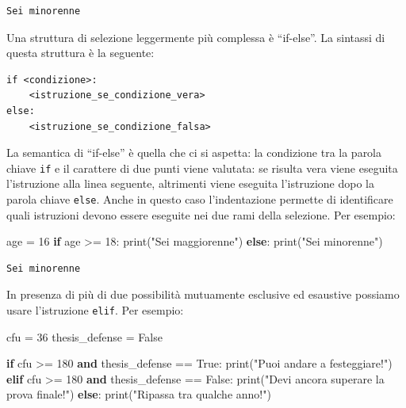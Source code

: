 \documentclass[
  letterpaper,
  krantz2]{{[}./krantz{]}}
\newenvironment{Shaded}{\begin{snugshade}}{\end{snugshade}}
\newcommand{\BuiltInTok}[1]{\textcolor[rgb]{0.00,0.23,0.31}{#1}}
\newcommand{\ControlFlowTok}[1]{\textcolor[rgb]{0.00,0.23,0.31}{\textbf{#1}}}
\newcommand{\DecValTok}[1]{\textcolor[rgb]{0.68,0.00,0.00}{#1}}
\newcommand{\KeywordTok}[1]{\textcolor[rgb]{0.00,0.23,0.31}{\textbf{#1}}}
\newcommand{\NormalTok}[1]{\textcolor[rgb]{0.00,0.23,0.31}{#1}}
\newcommand{\OperatorTok}[1]{\textcolor[rgb]{0.37,0.37,0.37}{#1}}
\newcommand{\StringTok}[1]{\textcolor[rgb]{0.13,0.47,0.30}{#1}}
\newcommand{\VariableTok}[1]{\textcolor[rgb]{0.07,0.07,0.07}{#1}}
\begin{document}
\begin{verbatim}
Sei minorenne
\end{verbatim}

Una struttura di selezione leggermente più complessa è ``if-else''. La
sintassi di questa struttura è la seguente:

\begin{verbatim}
if <condizione>:
    <istruzione_se_condizione_vera>
else:
    <istruzione_se_condizione_falsa>
\end{verbatim}

La semantica di ``if-else'' è quella che ci si aspetta: la condizione
tra la parola chiave \texttt{if} e il carattere di due punti viene
valutata: se risulta vera viene eseguita l'istruzione alla linea
seguente, altrimenti viene eseguita l'istruzione dopo la parola chiave
\texttt{else}. Anche in questo caso l'indentazione permette di
identificare quali istruzioni devono essere eseguite nei due rami della
selezione. Per esempio:

\begin{Shaded}
\begin{Highlighting}[]
\NormalTok{age }\OperatorTok{=} \DecValTok{16}
\ControlFlowTok{if}\NormalTok{ age }\OperatorTok{\textgreater{}=} \DecValTok{18}\NormalTok{:}
    \BuiltInTok{print}\NormalTok{(}\StringTok{"Sei maggiorenne"}\NormalTok{)}
\ControlFlowTok{else}\NormalTok{:}
    \BuiltInTok{print}\NormalTok{(}\StringTok{"Sei minorenne"}\NormalTok{)}
\end{Highlighting}
\end{Shaded}

\begin{verbatim}
Sei minorenne
\end{verbatim}

In presenza di più di due possibilità mutuamente esclusive ed esaustive
possiamo usare l'istruzione \texttt{elif}. Per esempio:

\begin{Shaded}
\begin{Highlighting}[]
\NormalTok{cfu }\OperatorTok{=} \DecValTok{36}
\NormalTok{thesis\_defense }\OperatorTok{=} \VariableTok{False}

\ControlFlowTok{if}\NormalTok{ cfu }\OperatorTok{\textgreater{}=} \DecValTok{180} \KeywordTok{and}\NormalTok{ thesis\_defense }\OperatorTok{==} \VariableTok{True}\NormalTok{:}
    \BuiltInTok{print}\NormalTok{(}\StringTok{"Puoi andare a festeggiare!"}\NormalTok{)}
\ControlFlowTok{elif}\NormalTok{ cfu }\OperatorTok{\textgreater{}=} \DecValTok{180} \KeywordTok{and}\NormalTok{ thesis\_defense }\OperatorTok{==} \VariableTok{False}\NormalTok{:}
    \BuiltInTok{print}\NormalTok{(}\StringTok{"Devi ancora superare la prova finale!"}\NormalTok{)}
\ControlFlowTok{else}\NormalTok{:}
    \BuiltInTok{print}\NormalTok{(}\StringTok{"Ripassa tra qualche anno!"}\NormalTok{)}
\end{Highlighting}
\end{Shaded}
\end{document}
